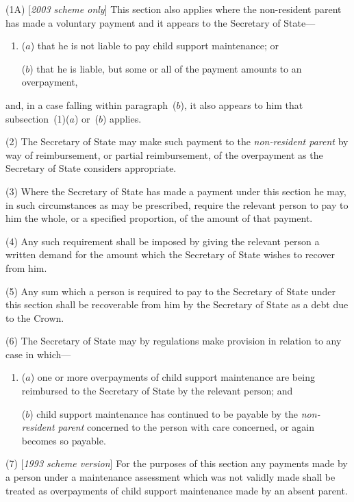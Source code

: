\documentclass[12pt,a4paper]{article}
\begin{document}
(1A) [\emph{2003 scheme only}] This section also applies where the non-resident parent has made a voluntary payment and it appears to the Secretary of State—
\begin{enumerate}\item[]
($a$) that he is not liable to pay child support maintenance; or

($b$) that he is liable, but some or all of the payment amounts to an overpayment,
\end{enumerate}
and, in a case falling within paragraph~($b$), it also appears to him that subsection~(1)($a$)  or~($b$)  applies.

(2) The Secretary of State may make such payment to the 
\emph{non-resident parent}  %
by way of reimbursement, or partial reimbursement, of the overpayment as the Secretary of State considers appropriate.

(3) Where the Secretary of State has made a payment under this section he may, in such circumstances as may be prescribed, require the relevant person to pay to him the whole, or a specified proportion, of the amount of that payment.

(4) Any such requirement shall be imposed by giving the relevant person a written demand for the amount which the Secretary of State wishes to recover from him.

(5) Any sum which a person is required to pay to the Secretary of State under this section shall be recoverable from him by the Secretary of State as a debt due to the Crown.

(6) The Secretary of State may by regulations make provision in relation to any case in which—
\begin{enumerate}\item[]
($a$) one or more overpayments of child support maintenance are being reimbursed to the Secretary of State by the relevant person; and

($b$) child support maintenance has continued to be payable by the 
\emph{non-resident parent}  %
concerned to the person with care concerned, or again becomes so payable.
\end{enumerate}

(7) [\emph{1993 scheme version}] For the purposes of this section any payments made by a person under a maintenance assessment which was not validly made shall be treated as overpayments of child support maintenance made by an absent parent.
\end{document}
